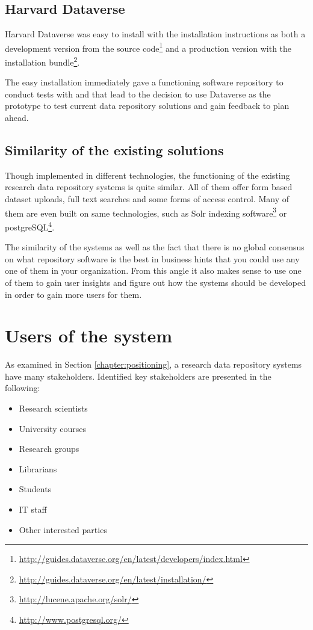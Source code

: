 \subsection{Harvard Dataverse}

Harvard Dataverse was easy to install with the installation instructions as
both a development version from the source
code\footnote{\url{http://guides.dataverse.org/en/latest/developers/index.html}} and a
production version with
the installation bundle\footnote{\url{http://guides.dataverse.org/en/latest/installation/}}.

The easy installation immediately gave a functioning software repository to
conduct tests with and that lead to the decision to use Dataverse as the
prototype to test current data repository solutions and gain feedback to plan
ahead.

\subsection{Similarity of the existing solutions}

Though implemented in different technologies, the functioning of the existing
research data repository systems is quite similar. All of them offer form based
dataset uploads, full text searches and some forms of access control. Many of
them are even built on same technologies, such as Solr indexing
software\footnote{\label{solr}\url{http://lucene.apache.org/solr/}} or
postgreSQL\footnote{\label{postgre}\url{http://www.postgresql.org/}}.

The similarity of the systems as well as the fact that there is no global
consensus on what repository software is the best in business hints that you
could use any one of them in your organization. From this angle it also makes
sense to use one of them to gain user insights and figure out how the systems
should be developed in order to gain more users for them.

\section{Users of the system}
\label{sec:users}

As examined in Section \ref{chapter:positioning}, a research data repository
systems have many stakeholders. Identified key stakeholders are presented in
the following:

\begin{itemize}
    \item Research scientists
    \item University courses
    \item Research groups
    \item Librarians
    \item Students
    \item IT staff
    \item Other interested parties
\end{itemize}

